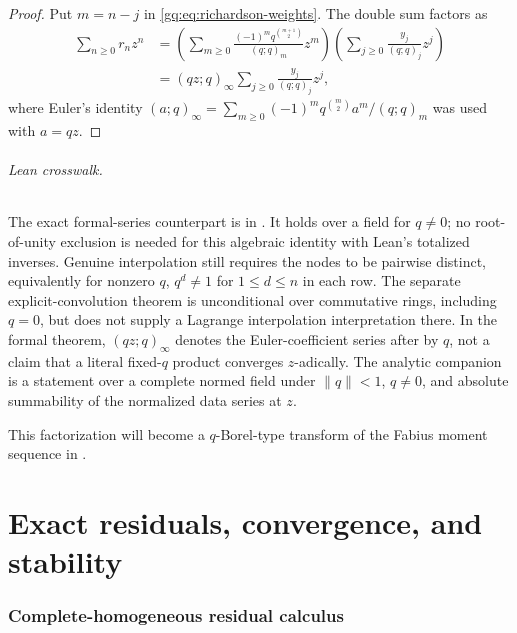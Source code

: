 \begin{proof}
Put $m=n-j$ in \eqref{gq:eq:richardson-weights}.  The double sum factors as
\begin{align*}
 \sum_{n\ge0}r_nz^n
 &=\left(\sum_{m\ge0}
   \frac{(-1)^mq^{\binom{m+1}{2}}}{(q;q)_m}z^m\right)
   \left(\sum_{j\ge0}\frac{y_j}{(q;q)_j}z^j\right)\\
 &=(qz;q)_\infty
   \sum_{j\ge0}\frac{y_j}{(q;q)_j}z^j,
\end{align*}
where Euler's identity
$(a;q)_\infty=\sum_{m\ge0}(-1)^mq^{\binom m2}a^m/(q;q)_m$
was used with $a=qz$.
\end{proof}

\paragraph{Lean crosswalk.}
The exact formal-series counterpart is
 in
.  It holds over a field
for $q\ne0$; no root-of-unity exclusion is needed for this algebraic identity
with Lean's totalized inverses.  Genuine interpolation still requires the
nodes to be pairwise distinct, equivalently for nonzero $q$,
$q^d\ne1$ for $1\le d\le n$ in each row.  The separate explicit-convolution
theorem  is unconditional
over commutative rings, including $q=0$, but does not supply a Lagrange
interpolation interpretation there.  In the formal theorem,
$(qz;q)_\infty$ denotes the Euler-coefficient series
 after  by $q$, not a claim
that a literal fixed-$q$ product converges $z$-adically.  The analytic companion
 is a
 statement over a complete normed field under
$\lVert q\rVert<1$, $q\ne0$, and absolute summability of the normalized data
series at $z$.

This factorization will become a $q$-Borel-type transform of the Fabius
moment sequence in .

\part{Exact residuals, convergence, and stability}

\section{Complete-homogeneous residual calculus}
\label{gq:chap:residuals}

